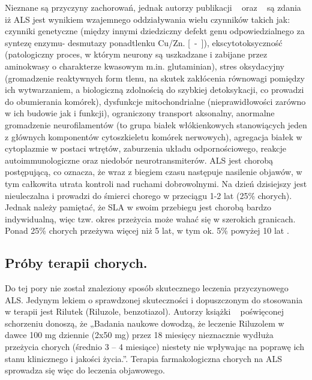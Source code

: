 \documentclass[twoside,a4paper]{book}
\begin{document}
Nieznane są przyczyny zachorowań, jednak autorzy publikacji ~\cite{alsWij} oraz ~\cite{motoneuron} są zdania iż ALS jest wynikiem wzajemnego oddziaływania wielu czynników takich jak: czynniki genetyczne (między innymi dziedziczny defekt genu odpowiedzialnego za syntezę enzymu- desmutazy ponadtlenku Cu/Zn. [~\cite{neurology}-~\cite{alsWij}]), ekscytotoksyczność (patologiczny proces, w którym neurony są uszkadzane i zabijane przez aminokwasy o charakterze kwasowym m.in. glutaminian), stres oksydacyjny (gromadzenie reaktywnych form tlenu, na skutek zakłócenia równowagi pomiędzy ich wytwarzaniem, a biologiczną zdolnością do szybkiej detoksykacji, co prowadzi do obumierania komórek), dysfunkcje mitochondrialne (nieprawidłowości zarówno w ich budowie jak i funkcji), ograniczony transport aksonalny, anormalne gromadzenie neurofilamentów (to grupa białek włókienkowych stanowiących jeden z głównych komponentów cytoszkieletu komórek nerwowych), agregacja białek w cytoplazmie w postaci wtrętów, zaburzenia układu odpornościowego, reakcje autoimmunologiczne oraz niedobór neurotransmiterów.
ALS jest chorobą postępującą, co oznacza, że wraz z biegiem czasu następuje nasilenie objawów, w tym całkowita utrata kontroli nad ruchami dobrowolnymi. Na dzień dzisiejszy jest nieuleczalna i prowadzi do śmierci chorego w przeciągu 1-2 lat (25\% chorych). Jednak należy pamiętać, że SLA w swoim przebiegu jest chorobą bardzo indywidualną, więc tzw. okres przeżycia może wahać się w szerokich granicach. Ponad 25\% chorych przeżywa więcej niż 5 lat, w tym ok. 5\%  powyżej 10 lat .~\cite{poradnik}
\subsection{Próby terapii chorych.}

Do tej pory nie został znaleziony sposób skutecznego leczenia przyczynowego ALS. Jedynym lekiem o sprawdzonej skuteczności i dopuszczonym do stosowania w terapii  jest Rilutek (Riluzole, benzotiazol). Autorzy książki ~\cite{alsAdamek} poświęconej schorzeniu donoszą, że  „Badania  naukowe  dowodzą, że leczenie Riluzolem w dawce 100 mg dziennie (2x50 mg) przez 18 miesięcy nieznacznie  wydłuża  przeżycia  chorych  (średnio 3 – 4 miesiące)  niestety  nie  wpływając  na  poprawę  ich  stanu  klinicznego  i  jakości życia.”.  Terapia farmakologiczna chorych na ALS sprowadza się więc do leczenia objawowego.  
\end{document}
